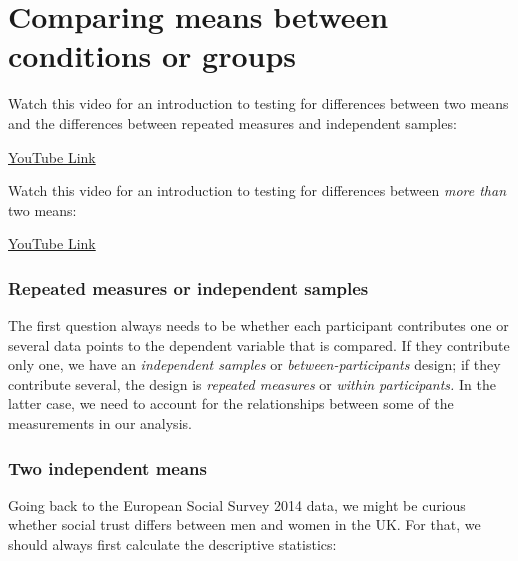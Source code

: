 \documentclass[
]{book}
\begin{document}
\hypertarget{comparing-means-between-conditions-or-groups}{%
\chapter{Comparing means between conditions or groups}\label{comparing-means-between-conditions-or-groups}}

Watch this video for an introduction to testing for differences between two means and the differences between repeated measures and independent samples:

\textcolor{blue}{\href{https://www.youtube.com/embed/L69HyBnvQRQ?rel=0&modestbranding=1&loop=1&playlist=sk7TT5qM5Hw}{YouTube Link}}

Watch this video for an introduction to testing for differences between \emph{more than} two means:

\textcolor{blue}{\href{https://www.youtube.com/embed/r96FYPLQ1l0?rel=0&modestbranding=1&loop=1&playlist=sk7TT5qM5Hw}{YouTube Link}}

\hypertarget{repeated-measures-or-independent-samples}{%
\subsection{Repeated measures or independent samples}\label{repeated-measures-or-independent-samples}}

The first question always needs to be whether each participant contributes one or several data points to the dependent variable that is compared. If they contribute only one, we have an \emph{independent samples} or \emph{between-participants} design; if they contribute several, the design is \emph{repeated measures} or \emph{within participants.} In the latter case, we need to account for the relationships between some of the measurements in our analysis.

\hypertarget{two-independent-means}{%
\subsection{Two independent means}\label{two-independent-means}}

Going back to the European Social Survey 2014 data, we might be curious whether social trust differs between men and women in the UK. For that, we should always first calculate the descriptive statistics:
\end{document}
